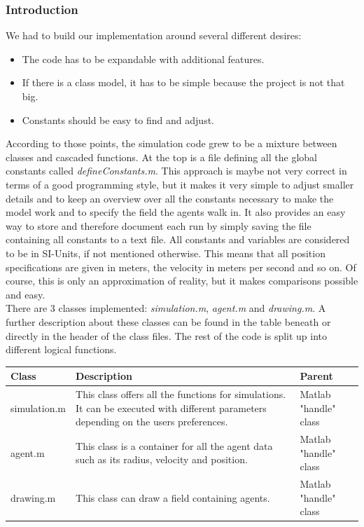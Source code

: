 
\subsubsection{Introduction}
We had to build our implementation around several different desires:

\begin{itemize}
\item The code has to be expandable with additional features.
\item If there is a class model, it has to be simple because the project is not that big.
\item Constants should be easy to find and adjust.
\end{itemize}

\noi According to those points, the simulation code grew to be a mixture between classes and cascaded functions. At the top is a file defining all the global constants called  \textit{defineConstants.m}. This approach is maybe not very correct in terms of a good programming style, but it makes it very simple to adjust smaller details and to keep an overview over all the constants necessary to make the model work and to specify the field the agents walk in. It also provides an easy way to store and therefore document each run by simply saving the file containing all constants to a text file. All constants and variables are considered to be in SI-Units, if not mentioned otherwise. This means that all position specifications are given in meters, the velocity in meters per second and so on. Of course, this is only an approximation of reality, but it makes comparisons possible and easy.\\

\noi There are 3 classes implemented: \textit{simulation.m}, \textit{agent.m} and \textit{drawing.m}. A further description about these classes can be found in the table beneath or directly in the header of the class files. The rest of the code is split up into different logical functions.\\[12px]
\begin{tabular}{|l|p{7cm}|l|}
        \hline
        Class & Description & Parent \\ \hline
        simulation.m
		& This class offers all the functions for simulations. It can be executed  
		with different parameters depending on the users preferences.           
		& Matlab "handle" class \\ \hline
		agent.m    
		& This class is a container for all the agent data such as its radius, velocity and 
		position.   
		& Matlab "handle" class \\ \hline
		drawing.m
		& This class can draw a field containing agents.           
		& Matlab "handle" class \\  \hline
\end{tabular}\\[12px]

